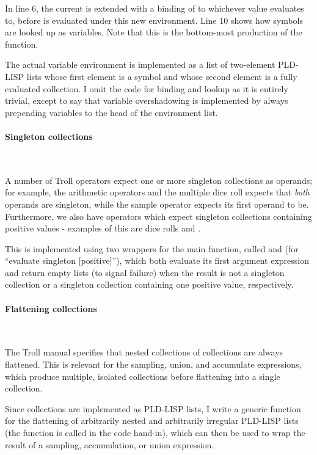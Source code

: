 In line 6, the current  is extended with a binding of  to
whichever value  evaluates to, before  is evaluated under this new
environment. Line 10 shows how symbols are looked up as variables. Note that
this is the bottom-most production of the  function.

\medskip

The actual variable environment  is implemented as a list of two-element
PLD-LISP lists whose first element is a symbol and whose second element is a
fully evaluated collection. I omit the code for binding and lookup as it is
entirely trivial, except to say that variable overshadowing is implemented by
always prepending variables to the head of the environment list.

\paragraph{Singleton collections}~\smallskip

A number of Troll operators expect one or more singleton collections as
operands; for example, the arithmetic operators and the multiple dice roll
expects that \emph{both} operands are singleton, while the sample operator
expects its first operand to be.
Furthermore, we also have operators which expect singleton collections
containing positive values - examples of this are dice rolls and
.

\smallskip

This is implemented using two wrappers for the main  function, called
 and  (for ``evaluate singleton [positive]''), which
both evaluate its first argument expression and return empty lists (to signal
failure) when the result is not a singleton collection or a singleton collection
containing one positive value, respectively.

\paragraph{Flattening collections}~\smallskip

The Troll manual specifies that nested collections of collections are always
flattened. This is relevant for the sampling, union, and accumulate
expressions, which produce multiple, isolated collections before flattening into
a single collection.

Since collections are implemented as PLD-LISP lists, I write a generic function
for the flattening of arbitrarily nested and arbitrarily irregular PLD-LISP
lists (the function is called  in the code hand-in), which can then
be used to wrap the result of a sampling, accumulation, or union expression.

